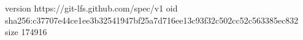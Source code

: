 version https://git-lfs.github.com/spec/v1
oid sha256:c37707e44ce1ee3b32541947bf25a7d716ee13c93f32c502cc52c563385ec832
size 174916
